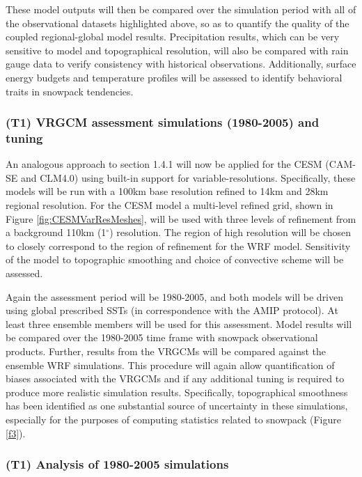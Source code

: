 \documentclass[11pt]{article}
\begin{document}
These model outputs will then be compared over the simulation period with all of the observational datasets highlighted above, so as to quantify the quality of the coupled regional-global model results. Precipitation results, which can be very sensitive to model and topographical resolution, will also be compared with rain gauge data to verify consistency with historical observations.  Additionally, surface energy budgets and temperature profiles will be assessed to identify behavioral traits in snowpack tendencies.



\subsubsection{(T1) VRGCM assessment simulations (1980-2005) and tuning}

An analogous approach to section 1.4.1 will now be applied  for  the  CESM  (CAM-SE and CLM4.0) using built-in support for variable-resolutions.  Specifically, these models will be run with a 100km base resolution refined to 14km and 28km regional resolution. For the CESM model a multi-level refined grid, shown in Figure \ref{fig:CESMVarResMeshes}, will be used with three levels of refinement from a background 110km (1$^\circ$) resolution. The region of high resolution will be chosen to closely correspond to the region of refinement for the WRF model.  Sensitivity of the model to topographic smoothing and choice of convective scheme will be assessed.  %

Again the assessment period will be 1980-2005, and both models will be driven using global prescribed SSTs (in correspondence with the AMIP protocol).  At least three ensemble members will be used for this assessment. Model results will be compared over the 1980-2005 time frame with snowpack observational products. Further, results from the VRGCMs will be compared against the ensemble WRF simulations. This procedure will again allow quantification of biases associated with the VRGCMs and if any additional tuning is required to produce more realistic simulation results.  Specifically, topographical smoothness has been identified as one substantial source of uncertainty in these simulations, especially for the purposes of computing statistics related to snowpack (Figure \ref{f3}).

\subsubsection{(T1) Analysis of 1980-2005 simulations}
\end{document}
